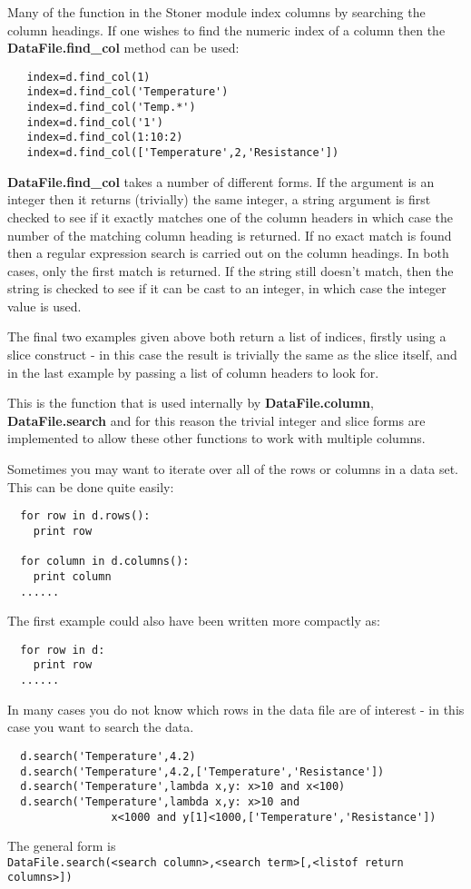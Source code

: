 \documentclass[a4paper,11pt]{scrartcl}
\begin{document}
Many of the function in the Stoner module index columns by searching the column
headings. If one wishes to find the numeric index of a column then the
\textbf{DataFile.find\_col} method can be used:

\begin{lstlisting}
   index=d.find_col(1)
   index=d.find_col('Temperature')
   index=d.find_col('Temp.*')
   index=d.find_col('1')
   index=d.find_col(1:10:2)
   index=d.find_col(['Temperature',2,'Resistance'])
\end{lstlisting}

 \textbf{DataFile.find\_col} takes a number of different forms. If the argument
is an integer then it returns (trivially) the same integer, a string argument is
first checked to see if it exactly matches one of the column headers in which
case the number of the matching column heading is returned. If no exact match is
found then a regular expression search is carried out on the column headings. In
both cases, only the first match is returned. If the string still doesn't match, then
the string is checked to see if it can be cast to an integer, in which case the integer value is used.

The final two examples given above
both return a list of indices, firstly using a slice construct - in this case
the result is trivially the same as the slice itself, and in the last example by
passing a list of column headers to look for.

This is the function that is used internally by \textbf{DataFile.column},
\textbf{DataFile.search} \etc and for this reason the trivial integer and slice
forms are implemented to allow these other functions to work with multiple
columns.

Sometimes you may want to iterate over all of the rows or columns in a data set.
This can be done quite easily:
\begin{lstlisting}
  for row in d.rows():
  	print row
  
  for column in d.columns():
  	print column
  ......
\end{lstlisting}
The first example could also have been written more compactly as:
\begin{lstlisting}
  for row in d:
  	print row
  ......
\end{lstlisting}

In many cases you do not know which rows in the data file are of interest - in
this case you want to search the data.
\begin{lstlisting}
  d.search('Temperature',4.2)
  d.search('Temperature',4.2,['Temperature','Resistance'])
  d.search('Temperature',lambda x,y: x>10 and x<100)
  d.search('Temperature',lambda x,y: x>10 and
                x<1000 and y[1]<1000,['Temperature','Resistance'])
\end{lstlisting}
The general form is \\\verb:DataFile.search(<search column>,<search term>[,<listof return columns>]):
\end{document}
